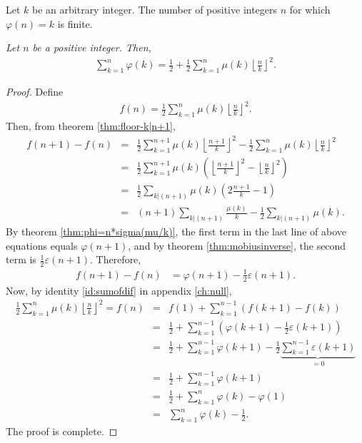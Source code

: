 \documentclass[12pt]{subfile}
\begin{document}
		\begin{corollary}
			Let $k$ be an arbitrary integer. The number of positive integers $n$ for which $\varphi(n) = k$ is finite.
		\end{corollary}

		\begin{theorem}\slshape
			Let $n$ be a positive integer. Then,
				\begin{align*}
					\sum_{k=1}^{n} \varphi(k) = \frac{1}{2} + \frac{1}{2}\sum_{k=1}^{n} \mu(k) \left\lfloor \frac{n}{k} \right\rfloor^2.
				\end{align*}
		\end{theorem}

		\begin{proof}
			Define
				\begin{align*}
					f(n) = \frac{1}{2}\sum_{k=1}^{n} \mu(k) \left\lfloor \frac{n}{k} \right\rfloor^2.
				\end{align*}
			Then, from theorem \ref{thm:floor-k|n+1},
				\begin{eqnarray*}
					f(n+1)-f(n) &=& \frac{1}{2}\sum_{k=1}^{n+1} \mu(k) \left\lfloor \frac{n+1}{k} \right\rfloor^2 - \frac{1}{2}\sum_{k=1}^{n} \mu(k) \left\lfloor \frac{n}{k} \right\rfloor^2\\
								&=& \frac{1}{2}\sum_{k=1}^{n+1} \mu(k) \left(\left\lfloor \frac{n+1}{k} \right\rfloor^2 - \left\lfloor \frac{n}{k} \right\rfloor^2\right)\\
								&=& \frac{1}{2}\sum_{k|(n+1)}\mu(k) \left(2 \frac{n+1}{k}-1\right)\\
								&=& (n+1)\sum_{k|(n+1)} \frac{\mu(k)}{k} - \frac{1}{2} \sum_{k|(n+1)} \mu(k).
				\end{eqnarray*}
			By theorem \ref{thm:phi=n*sigma(mu/k)}, the first term in the last line of above equations equals $\varphi(n+1)$, and by theorem \ref{thm:mobiusinverse}, the second term is $\frac{1}{2} \varepsilon(n+1)$. Therefore,
				\begin{align*}
					f(n+1)-f(n) &= \varphi(n+1) - \frac{1}{2}\varepsilon(n+1).
				\end{align*}
			Now, by identity \ref{id:sumofdif} in appendix \ref{ch:null},
				\begin{eqnarray*}
					\frac{1}{2}\sum_{k=1}^{n} \mu(k) \left\lfloor \frac{n}{k} \right\rfloor^2 = f(n)
						&=& f(1) + \sum_{k=1}^{n-1} \left(f(k+1)-f(k)\right)\\
						&=& \frac{1}{2} + \sum_{k=1}^{n-1} \left(\varphi(k+1) - \frac{1}{2}\varepsilon(k+1)\right)\\
						&=& \frac{1}{2} + \sum_{k=1}^{n-1} \varphi(k+1) - \frac{1}{2} \underbrace{\sum_{k=1}^{n-1} \varepsilon(k+1)}_{=0}\\
						&=& \frac{1}{2} + \sum_{k=1}^{n-1} \varphi(k+1)\\
						&=& \frac{1}{2} + \sum_{k=1}^{n} \varphi(k) - \varphi(1)\\
						&=& \sum_{k=1}^{n} \varphi(k) - \frac{1}{2}.
				\end{eqnarray*}
			The proof is complete.
		\end{proof}
\end{document}
